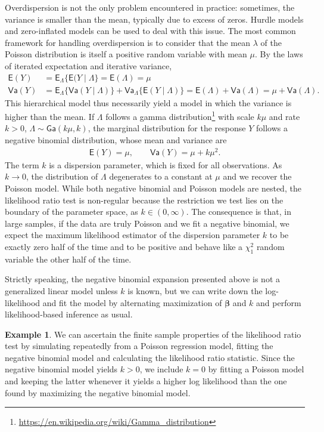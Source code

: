 \documentclass[
  11pt,
  letterpaper,
]{book}
\renewcommand{\href}[2]{#2\footnote{\url{#1}}}
\theoremstyle{definition}
\theoremstyle{definition}
\newtheorem{example}{Example}[chapter]
\theoremstyle{definition}
\theoremstyle{definition}
\theoremstyle{remark}
\begin{document}
Overdispersion is not the only problem encountered in practice: sometimes, the variance is smaller than the mean, typically due to excess of zeros. Hurdle models and zero-inflated models can be used to deal with this issue. The most common framework for handling overdispersion is to consider that the mean \(\lambda\) of the Poisson distribution is itself a positive random variable with mean \(\mu\). By the laws of iterated expectation and iterative variance,
\begin{align*}
\mathsf{E}(Y) &= \mathsf{E}_{\Lambda}\{\mathsf{E}(Y \mid \Lambda\} = \mathsf{E}(\Lambda) = \mu\\
\mathsf{Va}(Y) &= \mathsf{E}_{\Lambda}\{\mathsf{Va}(Y \mid \Lambda)\} + \mathsf{Va}_{\Lambda}\{\mathsf{E}(Y \mid \Lambda)\} = \mathsf{E}(\Lambda) + \mathsf{Va}(\Lambda) = \mu + \mathsf{Va}(\Lambda).
\end{align*}
This hierarchical model thus necessarily yield a model in which the variance is higher than the mean. If \(\Lambda\) follows a \href{https://en.wikipedia.org/wiki/Gamma_distribution}{gamma distribution} with scale \(k\mu\) and rate \(k>0\), \(\Lambda \sim \mathsf{Ga}(k\mu, k)\), the marginal distribution for the response \(Y\) follows a negative binomial distribution, whose mean and variance are
\begin{align*}
\mathsf{E}(Y) = \mu, \qquad \mathsf{Va}(Y) = \mu + k \mu^2.
\end{align*}
The term \(k\) is a dispersion parameter, which is fixed for all observations. As \(k \to 0\), the distribution of \(\Lambda\) degenerates to a constant at \(\mu\) and we recover the Poisson model. While both negative binomial and Poisson models are nested, the likelihood ratio test is non-regular because the restriction we test lies on the boundary of the parameter space, as \(k \in (0, \infty)\). The consequence is that, in large samples, if the data are truly Poisson and we fit a negative binomial, we expect the maximum likelihood estimator of the dispersion parameter \(k\) to be exactly zero half of the time and
to be positive and behave like a \(\chi_1^2\) random variable the other half of the time.

Strictly speaking, the negative binomial expansion presented above is not a generalized linear model unless \(k\) is known, but we can write down the log-likelihood and fit the model by alternating maximization of \(\boldsymbol{\beta}\) and \(k\) and perform likelihood-based inference as usual.

\begin{example}
\protect\hypertarget{exm:unnamed-chunk-2}{}{\label{exm:unnamed-chunk-2} }We can ascertain the finite sample properties of the likelihood ratio test by simulating repeatedly from a Poisson regression model, fitting the negative binomial model and calculating the likelihood ratio statistic. Since the negative binomial model yields \(k>0\), we include \(k=0\) by fitting a Poisson model and keeping the latter whenever it yields a higher log likelihood than the one found by maximizing the negative binomial model.
\end{example}
\end{document}
